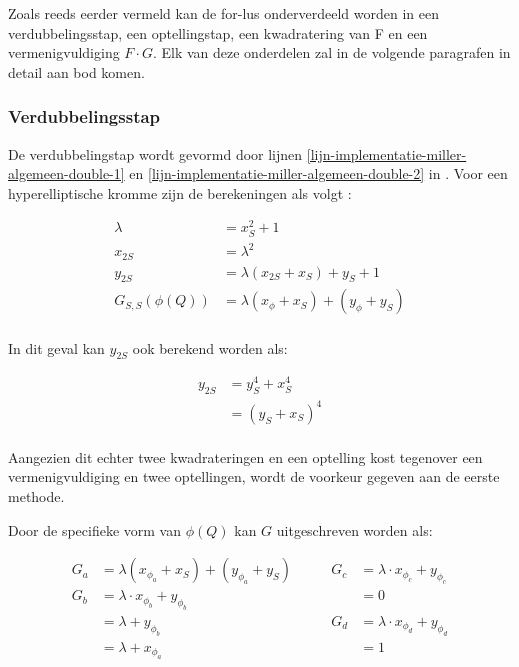 Zoals reeds eerder vermeld kan de for-lus onderverdeeld worden in een verdubbelingsstap, een optellingstap, een kwadratering van F en een vermenigvuldiging $F \cdot G$. Elk van deze onderdelen zal in de volgende paragrafen in detail aan bod komen.

\subsubsection{Verdubbelingsstap}

De verdubbelingstap wordt gevormd door lijnen \ref{lijn-implementatie-miller-algemeen-double-1} en \ref{lijn-implementatie-miller-algemeen-double-2} in . Voor een hyperelliptische kromme zijn de berekeningen als volgt \cite{bertoni}:

\[\begin{aligned}
	\lambda &= x_S^2 + 1\\
	x_{2S} &= \lambda ^2\\
	y_{2S} &= \lambda (x_{2S} + x_S) + y_S + 1\\
	G_{S,S}(\phi(Q)) &= \lambda (x_{\phi} + x_S) + (y_{\phi} + y_S)\\
\end{aligned}\]

In dit geval kan $y_{2S}$ ook berekend worden als:

\[\begin{aligned}
y_{2S}	&= y_S^4 + x_S^4\\
			&= (y_S + x_S)^4\\	
\end{aligned}\]

Aangezien dit echter twee kwadrateringen en een optelling kost tegenover een vermenigvuldiging en twee optellingen, wordt de voorkeur gegeven aan de eerste methode.

Door de specifieke vorm van $\phi(Q)$ kan $G$ uitgeschreven worden als:

\[\begin{aligned}
	G_a	&=	\lambda (x_{\phi_a} + x_S) + (y_{\phi_a} + y_S)\qquad&
				G_c	&= \lambda \cdot x_{\phi_c} + y_{\phi_c}\\
	G_b	&=	\lambda \cdot x_{\phi_b} + y_{\phi_b}&
						&= 0\\
			&= \lambda + y_{\phi_b}&
				G_d	&= \lambda \cdot x_{\phi_d} + y_{\phi_d}\\
			&=	\lambda + x_{\phi_a}&
						&= 1\\
\end{aligned}\]

